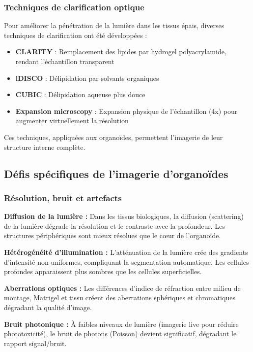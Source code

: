 \subsubsection{Techniques de clarification optique}

Pour améliorer la pénétration de la lumière dans les tissus épais, diverses techniques de clarification ont été développées :
\begin{itemize}
    \item \textbf{CLARITY} : Remplacement des lipides par hydrogel polyacrylamide, rendant l'échantillon transparent
    \item \textbf{iDISCO} : Délipidation par solvants organiques
    \item \textbf{CUBIC} : Délipidation aqueuse plus douce
    \item \textbf{Expansion microscopy} : Expansion physique de l'échantillon (4x) pour augmenter virtuellement la résolution
\end{itemize}

Ces techniques, appliquées aux organoïdes, permettent l'imagerie de leur structure interne complète.

\subsection{Défis spécifiques de l'imagerie d'organoïdes}

\subsubsection{Résolution, bruit et artefacts}

\textbf{Diffusion de la lumière :}
Dans les tissus biologiques, la diffusion (scattering) de la lumière dégrade la résolution et le contraste avec la profondeur. Les structures périphériques sont mieux résolues que le cœur de l'organoïde.

\textbf{Hétérogénéité d'illumination :}
L'atténuation de la lumière crée des gradients d'intensité non-uniformes, compliquant la segmentation automatique. Les cellules profondes apparaissent plus sombres que les cellules superficielles.

\textbf{Aberrations optiques :}
Les différences d'indice de réfraction entre milieu de montage, Matrigel et tissu créent des aberrations sphériques et chromatiques dégradant la qualité d'image.

\textbf{Bruit photonique :}
À faibles niveaux de lumière (imagerie live pour réduire phototoxicité), le bruit de photons (Poisson) devient significatif, dégradant le rapport signal/bruit.

